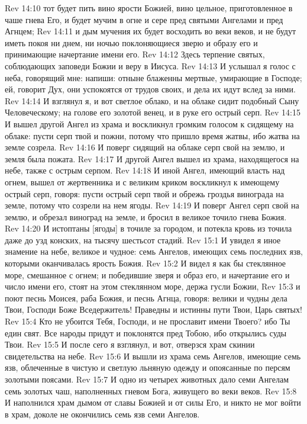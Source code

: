 Rev 14:10  тот будет пить вино ярости Божией, вино цельное, приготовленное в чаше гнева Его, и будет мучим в огне и сере пред святыми Ангелами и пред Агнцем;
Rev 14:11  и дым мучения их будет восходить во веки веков, и не будут иметь покоя ни днем, ни ночью поклоняющиеся зверю и образу его и принимающие начертание имени его.
Rev 14:12  Здесь терпение святых, соблюдающих заповеди Божии и веру в Иисуса.
Rev 14:13  И услышал я голос с неба, говорящий мне: напиши: отныне блаженны мертвые, умирающие в Господе; ей, говорит Дух, они успокоятся от трудов своих, и дела их идут вслед за ними.
Rev 14:14  И взглянул я, и вот светлое облако, и на облаке сидит подобный Сыну Человеческому; на голове его золотой венец, и в руке его острый серп.
Rev 14:15  И вышел другой Ангел из храма и воскликнул громким голосом к сидящему на облаке: пусти серп твой и пожни, потому что пришло время жатвы, ибо жатва на земле созрела.
Rev 14:16  И поверг сидящий на облаке серп свой на землю, и земля была пожата.
Rev 14:17  И другой Ангел вышел из храма, находящегося на небе, также с острым серпом.
Rev 14:18  И иной Ангел, имеющий власть над огнем, вышел от жертвенника и с великим криком воскликнул к имеющему острый серп, говоря: пусти острый серп твой и обрежь гроздья винограда на земле, потому что созрели на нем ягоды.
Rev 14:19  И поверг Ангел серп свой на землю, и обрезал виноград на земле, и бросил в великое точило гнева Божия.
Rev 14:20  И истоптаны [ягоды] в точиле за городом, и потекла кровь из точила даже до узд конских, на тысячу шестьсот стадий.
Rev 15:1  И увидел я иное знамение на небе, великое и чудное: семь Ангелов, имеющих семь последних язв, которыми оканчивалась ярость Божия.
Rev 15:2  И видел я как бы стеклянное море, смешанное с огнем; и победившие зверя и образ его, и начертание его и число имени его, стоят на этом стеклянном море, держа гусли Божии,
Rev 15:3  и поют песнь Моисея, раба Божия, и песнь Агнца, говоря: велики и чудны дела Твои, Господи Боже Вседержитель! Праведны и истинны пути Твои, Царь святых!
Rev 15:4  Кто не убоится Тебя, Господи, и не прославит имени Твоего? ибо Ты един свят. Все народы придут и поклонятся пред Тобою, ибо открылись суды Твои.
Rev 15:5  И после сего я взглянул, и вот, отверзся храм скинии свидетельства на небе.
Rev 15:6  И вышли из храма семь Ангелов, имеющие семь язв, облеченные в чистую и светлую льняную одежду и опоясанные по персям золотыми поясами.
Rev 15:7  И одно из четырех животных дало семи Ангелам семь золотых чаш, наполненных гневом Бога, живущего во веки веков.
Rev 15:8  И наполнился храм дымом от славы Божией и от силы Его, и никто не мог войти в храм, доколе не окончились семь язв семи Ангелов.
